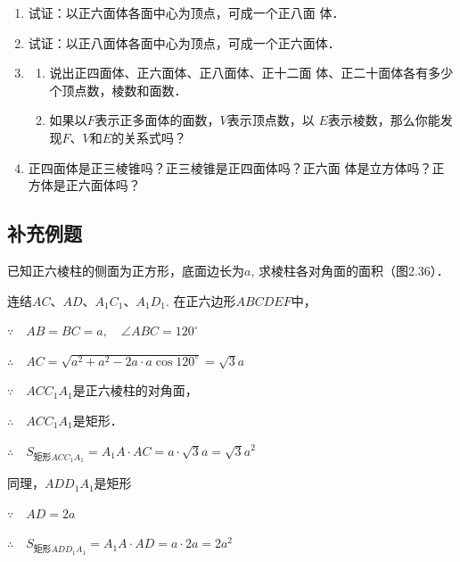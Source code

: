 \begin{ex}
\begin{enumerate}
    \item 试证：以正六面体各面中心为顶点，可成一个正八面
    体．
    \item 试证：以正八面体各面中心为顶点，可成一个正六面体．
    \item \begin{enumerate}
        \item 说出正四面体、正六面体、正八面体、正十二面
    体、正二十面体各有多少个顶点数，棱数和面数．
    \item 如果以$F$表示正多面体的面数，$V$表示顶点数，以
    $E$表示棱数，那么你能发现$F$、$V$和$E$的关系式吗？
\end{enumerate}
\item 正四面体是正三棱锥吗？正三棱锥是正四面体吗？正六面
    体是立方体吗？正方体是正六面体吗？
\end{enumerate}
\end{ex}

\subsection{补充例题}
\begin{example}
    已知正六棱柱的侧面为正方形，底面边长为$a$, 求棱柱各对角面的面积（图2.36）．
\end{example}

\begin{solution}
    连结$AC$、$AD$、$A_1C_1$、$A_1D_1$. 
在正六边形$ABCDEF$中，

$\because\quad AB=BC=a,\quad \angle ABC=120^{\circ}$

$\therefore\quad AC=\sqrt{a^2+a^2-2a\cdot a\cos120^{\circ}}=\sqrt{3}a$

$\because\quad ACC_1A_1$是正六棱柱的对角面，

$\therefore\quad ACC_1A_1$是矩形．

$\therefore\quad S_{\text{矩形}ACC_1A_1}=A_1A\cdot AC=a\cdot\sqrt{3}a=\sqrt{3}a^2$

同理，$ADD_1A_1$是矩形

$\because\quad AD=2a$

$\therefore\quad S_{\text{矩形}ADD_1A_1}=A_1A\cdot AD=a\cdot 2a=2a^2$
\end{solution}


